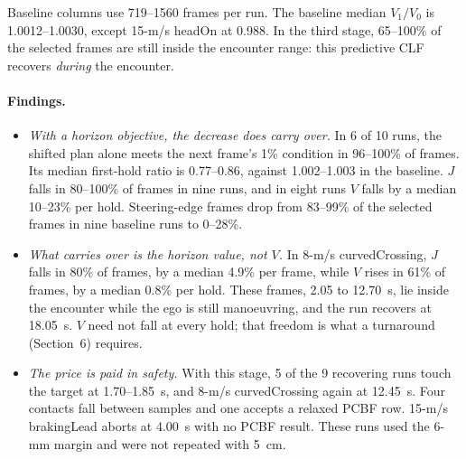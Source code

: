 \documentclass[11pt]{article}
\begin{document}
Baseline columns use 719--1560 frames per run. The baseline median $V_1/V_0$ is
1.0012--1.0030, except 15-m/s headOn at 0.988. In the third stage, 65--100\% of
the selected frames are still inside the encounter range: this predictive CLF
recovers \emph{during} the encounter.

\paragraph{Findings.}
\begin{itemize}
\item \emph{With a horizon objective, the decrease does carry over.} In 6 of 10
runs, the shifted plan alone meets the next frame's 1\% condition in 96--100\% of
frames. Its median first-hold ratio is 0.77--0.86, against 1.002--1.003 in the
baseline. $J$ falls in 80--100\% of frames in nine runs, and in eight runs $V$
falls by a median 10--23\% per hold. Steering-edge frames drop from 83--99\% of
the selected frames in nine baseline runs to 0--28\%.
\item \emph{What carries over is the horizon value, not $V$.} In 8-m/s
curvedCrossing, $J$ falls in 80\% of frames, by a median 4.9\% per frame, while
$V$ rises in 61\% of frames, by a median 0.8\% per hold. These frames, 2.05 to
12.70~s, lie inside the encounter while the ego is still manoeuvring, and the
run recovers at 18.05~s. $V$ need not fall at every hold; that freedom is what a
turnaround (Section~6) requires.
\item \emph{The price is paid in safety.} With this stage, 5 of the 9 recovering
runs touch the target at 1.70--1.85~s, and 8-m/s curvedCrossing again at
12.45~s. Four contacts fall between samples and one accepts a relaxed PCBF
row. 15-m/s brakingLead aborts at 4.00~s with no PCBF
result. These runs used the 6-mm margin and were not repeated with 5~cm.
\end{itemize}
\end{document}
